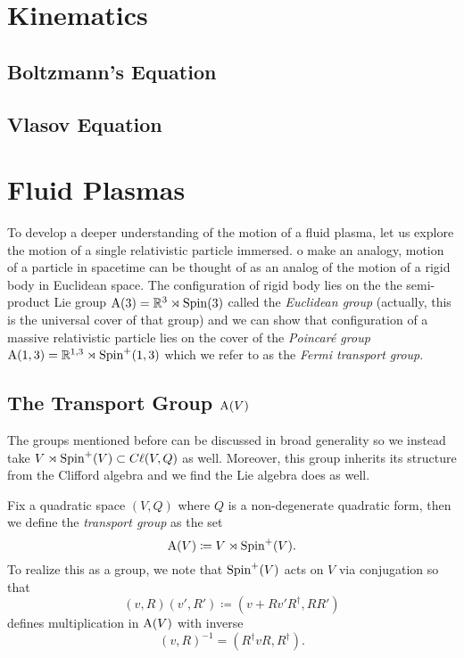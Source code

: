 \documentclass[conf]{new-aiaa}
\begin{document}
\section{Kinematics}

\subsection{Boltzmann's Equation}

\subsection{Vlasov Equation}

\section{Fluid Plasmas}
\label{sec:spinor_equations}

To develop a deeper understanding of the motion of a fluid plasma, let us explore the motion of a single relativistic particle immersed. o make an analogy, motion of a particle in spacetime can be thought of as an analog of the motion of a rigid body in Euclidean space. The configuration of rigid body lies on the the semi-product Lie group $\mathrm{A}(3)=\mathbb{R}^3 \rtimes \operatorname{Spin}(3)$ called the \emph{Euclidean group} (actually, this is the universal cover of that group) and we can show that configuration of a massive relativistic particle lies on the cover of the \emph{Poincar\'e group} $\mathrm{A}(1,3) = \mathbb{R}^{1,3} \rtimes \operatorname{Spin}^+(1,3)$ which we refer to as the \emph{Fermi transport group}.

\subsection{The Transport Group $\operatorname{A}(V)$}

The groups mentioned before can be discussed in broad generality so we instead take $V\rtimes \operatorname{Spin}^+(V) \subset C\ell(V,Q)$ as well. Moreover, this group inherits its structure from the Clifford algebra and we find the Lie algebra does as well. 

\begin{definition}
Fix a quadratic space $(V,Q)$ where $Q$ is a non-degenerate quadratic form, then we define the \emph{transport group} as the set
\begin{equation}
\operatorname{A}(V)\coloneqq V\rtimes \operatorname{Spin}^+(V).
\end{equation}
To realize this as a group, we note that $\operatorname{Spin}^+(V)$ acts on $V$ via conjugation so that
\begin{equation}
\label{eq:product_in_A}
(v,R)(v',R')\coloneqq(v+Rv'R^\dagger, RR')
\end{equation}
defines multiplication in $\operatorname{A}(V)$ with inverse
\begin{equation}
(v,R)^{-1} = (R^\dagger v R, R^\dagger).
\end{equation}
\end{definition}
\end{document}
